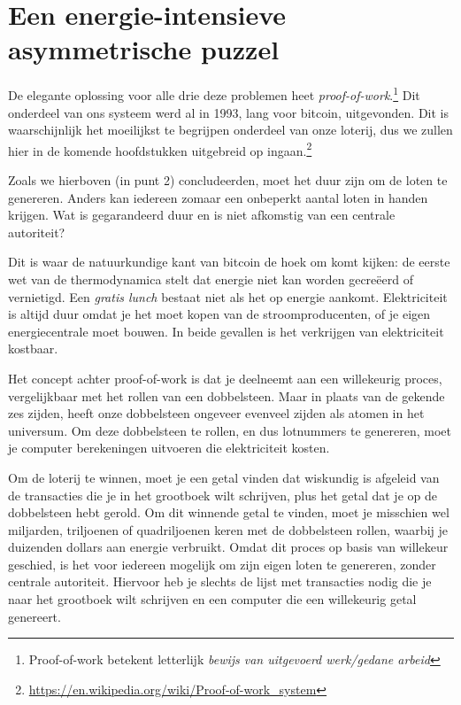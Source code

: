 \documentclass[smalldemyvopaper,11pt,twoside,onecolumn,openright,extrafontsizes]{memoir}
\begin{document}
\section[Energie-intensieve asymmetrische puzzel]{Een energie-intensieve asymmetrische puzzel}

De elegante oplossing voor alle drie deze problemen heet \textit{proof-of-work}.\footnote{ Proof-of-work betekent letterlijk \textit{bewijs van uitgevoerd werk/gedane arbeid}} Dit onderdeel van ons systeem werd al in 1993, lang voor bitcoin, uitgevonden. Dit is waarschijnlijk het moeilijkst te begrijpen onderdeel van onze loterij, dus we zullen hier in de komende hoofdstukken uitgebreid op ingaan.\footnote{\href{https://en.wikipedia.org/wiki/Proof-of-work\_system}{https://en.wikipedia.org/wiki/Proof-of-work\_system}} 

Zoals we hierboven (in punt 2) concludeerden, moet het duur zijn om de loten te genereren. Anders kan iedereen zomaar een onbeperkt aantal loten in handen krijgen. Wat is gegarandeerd duur en is niet afkomstig van een centrale autoriteit?

Dit is waar de natuurkundige kant van bitcoin de hoek om komt kijken: de eerste wet van de thermodynamica stelt dat energie niet kan worden gecreëerd of vernietigd. Een \textit{gratis lunch} bestaat niet als het op energie aankomt. Elektriciteit is altijd duur omdat je het moet kopen van de stroomproducenten, of je eigen energiecentrale moet bouwen. In beide gevallen is het verkrijgen van elektriciteit kostbaar.

Het concept achter proof-of-work is dat je deelneemt aan een willekeurig proces, vergelijkbaar met het rollen van een dobbelsteen. Maar in plaats van de gekende zes zijden, heeft onze dobbelsteen ongeveer evenveel zijden als atomen in het universum. Om deze dobbelsteen te rollen, en dus lotnummers te genereren, moet je computer berekeningen uitvoeren die elektriciteit kosten.

Om de loterij te winnen, moet je een getal vinden dat wiskundig is afgeleid van de transacties die je in het grootboek wilt schrijven, plus het getal dat je op de dobbelsteen hebt gerold. Om dit winnende getal te vinden, moet je misschien wel miljarden, triljoenen of quadriljoenen keren met de dobbelsteen rollen, waarbij je duizenden dollars aan energie verbruikt. Omdat dit proces op basis van willekeur geschied, is het voor iedereen mogelijk om zijn eigen loten te genereren, zonder centrale autoriteit. Hiervoor heb je slechts de lijst met transacties nodig die je naar het grootboek wilt schrijven en een computer die een willekeurig getal genereert. 
\end{document}
